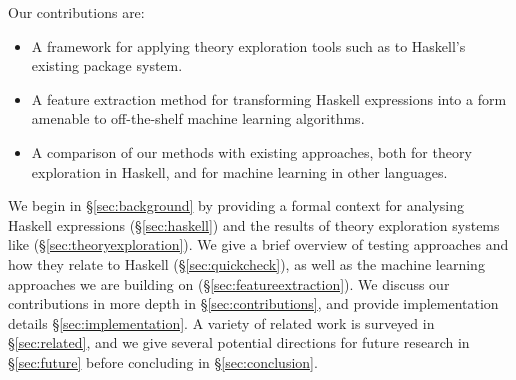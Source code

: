 Our contributions are:

\begin{itemize}
  \item A framework for applying theory exploration tools such as \qspec{} to Haskell's existing package system.
  \item A feature extraction method for transforming Haskell expressions into a form amenable to off-the-shelf machine learning algorithms. \iffalse TODO: say how this item fits in the TE agenda. \fi
  \item A comparison of our methods with existing approaches, both for theory exploration in Haskell, and for machine learning in other languages.
\end{itemize}

We begin in \S \ref{sec:background} by providing a formal context for analysing Haskell expressions (\S \ref{sec:haskell}) and the results of theory exploration systems like \qspec{} (\S \ref{sec:theoryexploration}). We give a brief overview of testing approaches and how they relate to Haskell (\S \ref{sec:quickcheck}), as well as the machine learning approaches we are building on (\S \ref{sec:featureextraction}). We discuss our contributions in more depth in \S \ref{sec:contributions}, and provide implementation details \S \ref{sec:implementation}. A variety of related work is surveyed in \S \ref{sec:related}, and we give several potential directions for future research in \S \ref{sec:future} before concluding in \S \ref{sec:conclusion}.
